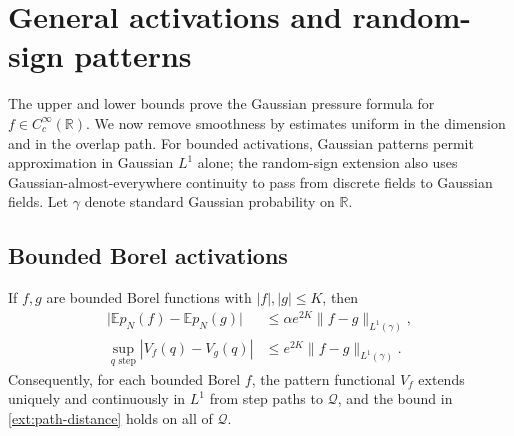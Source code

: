 \section{General activations and random-sign patterns}\label{sec:extensions}

The upper and lower bounds prove the Gaussian pressure formula for
$f\in C_c^\infty(\mathbb R)$. We now remove smoothness by estimates
uniform in the dimension and in the overlap path. For bounded activations,
Gaussian patterns permit approximation in Gaussian $L^1$ alone; the
random-sign extension also uses Gaussian-almost-everywhere continuity
to pass from discrete fields to Gaussian fields.
Let $\gamma$ denote standard Gaussian probability on
$\mathbb R$.

\subsection{Bounded Borel activations}

\begin{lemma}
\label{ext:path-approx}
If $f,g$ are bounded Borel functions with $|f|,|g|\le K$, then
\begin{align}
 \big|\mathbb E p_N(f)-\mathbb E p_N(g)\big|
 &\le\alpha e^{2K}\|f-g\|_{L^1(\gamma)},\label{ext:pressure-distance}\\
 \sup_{q\text{ step}}|V_f(q)-V_g(q)|
 &\le e^{2K}\|f-g\|_{L^1(\gamma)}.\label{ext:path-distance}
\end{align}
Consequently, for each bounded Borel $f$, the pattern functional $V_f$
extends uniquely and continuously in $L^1$ from step paths to $\mathcal Q$,
and the bound in \eqref{ext:path-distance} holds on all of $\mathcal Q$.
\end{lemma}

